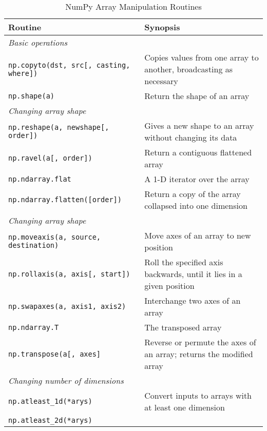 \documentclass[a4paper,11pt]{book}
\numberwithin{figure}{chapter}
\numberwithin{table}{chapter}
\begin{document}
\begin{appendices}
\begin{table}
	\caption{NumPy Array Manipulation Routines}
	\label{tab:numpy_array_manipulation}
	\begin{tabular}{lp{8.5cm}}
		\toprule \toprule
		Routine & Synopsis \\ \midrule
		\multicolumn{1}{l}{\textit{Basic operations}} \\ 
		\midrule
		\texttt{np.copyto(dst, src[, casting, where])} &
                Copies values from one array to another, broadcasting as necessary\\
                \texttt{np.shape(a)} &
                Return the shape of an array\\
		\midrule
		\multicolumn{1}{l}{\textit{Changing array shape}} \\ 
		\midrule
  		\texttt{np.reshape(a, newshape[, order])}&
                Gives a new shape to an array without changing its data\\
   	        \texttt{np.ravel(a[, order])} &
                Return a contiguous flattened array\\
                \texttt{np.ndarray.flat}&
                A 1-D iterator over the array\\
                \texttt{np.ndarray.flatten([order])}&
		Return a copy of the array collapsed into one dimension\\
		\midrule
		\multicolumn{1}{l}{\textit{Changing array shape}} \\ 
	        \texttt{np.moveaxis(a, source, destination)}&
                Move axes of an array to new position\\
                \texttt{np.rollaxis(a, axis[, start])}&
                Roll the specified axis backwards, until it lies in a given position\\
                \texttt{np.swapaxes(a, axis1, axis2)}&
                Interchange two axes of an array\\
                \texttt{np.ndarray.T}&
                The transposed array\\
                \texttt{np.transpose(a[, axes]}&
                Reverse or permute the axes of an array; returns the modified array\\
		\midrule
		\multicolumn{1}{l}{\textit{Changing number of dimensions}} \\ 
		\midrule
                \texttt{np.atleast\_1d(*arys)}&
                Convert inputs to arrays with at least one dimension\\
                \texttt{np.atleast\_2d(*arys)}&

\end{tabular}
\end{table}
\end{appendices}
\end{document}
